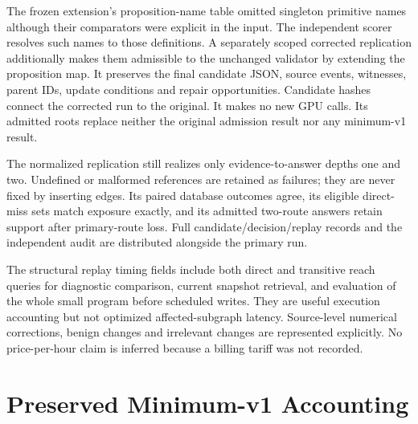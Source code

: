 \documentclass[runningheads]{llncs}
\newcommand{\suppTable}[3]{\begin{table}[!ht]\caption{#2}\label{#3}\centering\scriptsize
\setlength{\tabcolsep}{3pt}\end{table}}
\begin{document}
\suppTable{generated/semantic/extension_requests}{Separate extension inference
accounting. Roots count candidates admitted by that stage's runtime. All calls
use Qwen3-8B BF16 on the existing RTX 5090. CPU database replays add no model
requests. The core's 325 calls remain below its 480-call cap.}{tab:extensionrequests}

The frozen extension's proposition-name table omitted singleton primitive names
although their comparators were explicit in the input. The independent scorer
resolves such names to those definitions. A separately scoped corrected
replication additionally makes them admissible to the unchanged validator by
extending the proposition map. It preserves the final candidate JSON, source
events, witnesses, parent IDs, update conditions and repair opportunities.
Candidate hashes connect the corrected run to the original. It makes no new GPU
calls. Its \SemAliasRoots{} admitted roots replace neither the original
\SemCoreRoots{} admission result nor any minimum-v1 result.

\suppTable{generated/semantic/alias_table}{Separate primitive-name normalization
replication: 240 cases, four update conditions and five methods (4,800 cells).
All original model outputs and parent links are unchanged. Correction intervals
use 15 dataset-scoped participants and 30 episodes.}{tab:alias}

The normalized replication still realizes only evidence-to-answer depths one and
two. Undefined or malformed references are retained as failures; they are never
fixed by inserting edges. Its paired database outcomes agree, its eligible
direct-miss sets match exposure exactly, and its admitted two-route answers retain
support after primary-route loss. Full candidate/decision/replay records and
the independent audit are distributed alongside the primary run.

The structural replay timing fields include both direct and transitive reach
queries for diagnostic comparison, current snapshot retrieval, and evaluation
of the whole small program before scheduled writes. They are useful execution
accounting but not optimized affected-subgraph latency. Source-level numerical
corrections, benign changes and irrelevant changes are represented explicitly.
No price-per-hour claim is inferred because a billing tariff was not recorded.

\section{Preserved Minimum-v1 Accounting}
\end{document}
